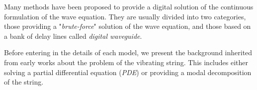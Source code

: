 {{%







				\label{subsubsubsec:CM_SS_Physics_Wave}

Many methods have been proposed to provide a digital solution of the continuous formulation of the wave equation. They are usually divided into two categories, those providing a "\emph{brute-force}" solution of the wave equation, and those based on a bank of delay lines called \emph{digital waveguide}.


					\label{subsubsubsubsec:CM_SS_Physics_Wave_Preliminaries}

Before entering in the details of each model, we present the background inherited from early works about the problem of the vibrating string. This includes either solving a partial differential equation (\emph{PDE}) or providing a modal decomposition of the string.

}}
